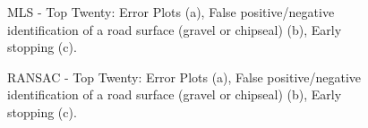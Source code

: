 \documentclass[numbered,pdftex]{ohio-etd}
\begin{document}
{\begin{figure}[H]
			\caption[MLS Top Twenty Error Plots]{MLS - Top Twenty: Error Plots (a), False positive/negative identification of a road surface (gravel or chipseal) (b), Early stopping (c).}
			
			\label{fig:mls_tt_error_plots}
			
		\end{figure}		
				
		\begin{figure}[H]
			
			
			
			
			\caption[RANSAC Top Twenty Error Plots]{RANSAC - Top Twenty: Error Plots (a), False positive/negative identification of a road surface (gravel or chipseal) (b), Early stopping (c).}
			

\end{figure}}
\end{document}
